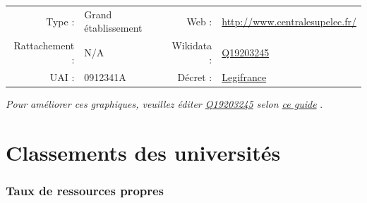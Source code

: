 \documentclass[12pt,french,landscape]{article}
\def\arraystretch{1.5}
\begin{document}
\begin{tabular*}{0.45\textwidth}{rp{2cm}rl}  
\hline  
Type : & Grand établissement & Web : &\href{http://www.centralesupelec.fr/}{http://www.centralesupelec.fr/} \\  
Rattachement : & N/A & Wikidata : & \href{https://www.wikidata.org/entity/Q19203245}{Q19203245} \\  
UAI : & 0912341A & Décret : & \href{http://legifrance.gouv.fr/affichTexte.do?cidTexte=JORFTEXT000030001939&dateTexte=&categorieLien=id}{Legifrance} \\  
\hline  
\end{tabular*}

\textit{\scriptsize Pour améliorer ces graphiques, veuillez éditer \href{https://www.wikidata.org/entity/Q19203245}{Q19203245}  selon \href{https://github.com/cpesr/wikidataESR/blob/master/Rmd/wikidataESR.md}{ce guide}}
.


\newpage

\vspace*{5cm}
\part{Classements des universités}
\newpage
\scriptsize
\def\arraystretch{1.2}

\hypertarget{taux-de-ressources-propres}{%
\section{Taux de ressources propres}\label{taux-de-ressources-propres}}
\end{document}
